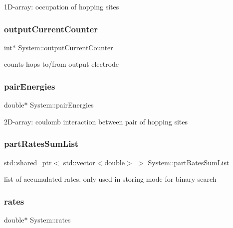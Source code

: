 1\+D-\/array\+: occupation of hopping sites \mbox{\label{classSystem_a236f2d392daa817d39a5b23a8e6a57d5}} 
\subsubsection{\texorpdfstring{output\+Current\+Counter}{outputCurrentCounter}}
{\footnotesize\ttfamily int$\ast$ System\+::output\+Current\+Counter}

counts hops to/from output electrode \mbox{\label{classSystem_acbe0d31bddfc490ec048dfaca2df2558}} 
\subsubsection{\texorpdfstring{pair\+Energies}{pairEnergies}}
{\footnotesize\ttfamily double$\ast$ System\+::pair\+Energies\hspace{0.3cm}{\ttfamily [private]}}

2\+D-\/array\+: coulomb interaction between pair of hopping sites \mbox{\label{classSystem_ae1d936be9d2c423ef42a2c16dc269e6c}} 
\subsubsection{\texorpdfstring{part\+Rates\+Sum\+List}{partRatesSumList}}
{\footnotesize\ttfamily std\+::shared\+\_\+ptr$<$ std\+::vector$<$double$>$ $>$ System\+::part\+Rates\+Sum\+List\hspace{0.3cm}{\ttfamily [private]}}

list of accumulated rates. only used in storing mode for binary search \mbox{\label{classSystem_ad89fb08497a4d886f64a91a7d302b296}} 
\subsubsection{\texorpdfstring{rates}{rates}}
{\footnotesize\ttfamily double$\ast$ System\+::rates\hspace{0.3cm}{\ttfamily [private]}}

